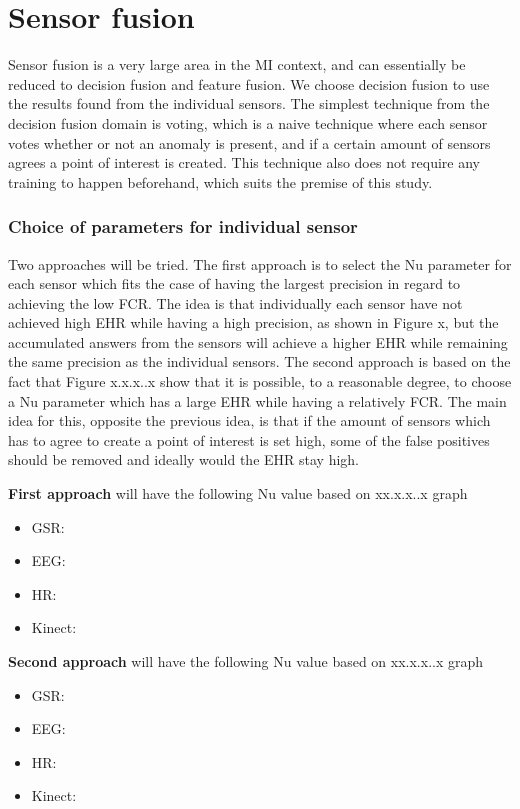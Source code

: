 \section{Sensor fusion}
Sensor fusion is a very large area in the MI context, and can essentially be reduced to decision fusion and feature fusion. 
We choose decision fusion to use the results found from the individual sensors.
The simplest technique from the decision fusion domain is voting, which is a naive technique where each sensor votes whether or not an anomaly is present, and if a certain amount of sensors agrees a point of interest is created. This technique also does not require any training to happen beforehand, which suits the premise of this study.

\subsubsection{Choice of parameters for individual sensor}
Two approaches will be tried. The first approach is to select the Nu parameter for each sensor which fits the case of having the largest precision in regard to achieving the low FCR. The idea is that individually each sensor have not achieved high EHR while having a high precision, as shown in Figure x, but the accumulated answers from the sensors will achieve a higher EHR while remaining the same precision as the individual sensors.
The second approach is based on the fact that Figure x.x.x..x show that it is possible, to a reasonable degree, to choose a Nu parameter which has a large EHR while having a relatively FCR. The main idea for this, opposite the previous idea, is that if the amount of sensors which has to agree to create a point of interest is set high, some of the false positives should be removed and ideally would the EHR stay high.

\textbf{First approach} will have the following Nu value based on xx.x.x..x graph
\begin{itemize}
\item GSR:
\item EEG:
\item HR:
\item Kinect:
\end{itemize}
\textbf{Second approach} will have the following Nu value based on xx.x.x..x graph
\begin{itemize}
\item GSR:
\item EEG:
\item HR:
\item Kinect:
\end{itemize}



